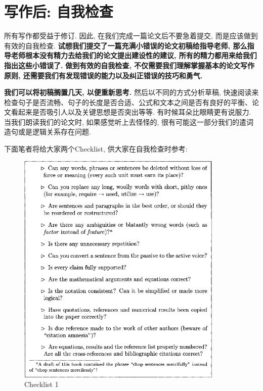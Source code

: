 \documentclass{formatBook}
\begin{document}
\section{写作后: 自我检查}
所有写作都受益于修订. 因此, 在我们完成一篇论文后不要急着提交, 而是应该做到有效的自我检查. \textbf{试想我们提交了一篇充满小错误的论文初稿给指导老师, 那么指导老师根本没有精力去给我们的论文提出建设性的建议, 所有的精力都用来给我们指出这些小错误了.} \textbf{做到有效的自我检查, 不仅需要我们理解掌握基本的论文写作原则, 还需要我们有发现错误的能力以及纠正错误的技巧和勇气. }\par
\textbf{我们可以将初稿搁置几天, 以便重新思考. }然后以不同的方式分析草稿, 快速阅读来检查句子是否流畅、句子的长度是否合适、公式和文本之间是否有良好的平衡、论文看起来是否吸引人以及关键思想是否突出等等. 有时候耳朵比眼睛更有说服力. 当我们朗读我们的论文时, 如果感觉听上去怪怪的, 很有可能这一部分我们的遣词造句或是逻辑关系存在问题. \par
下面笔者将给大家两个Checklist\cite{TanChecklist}, 供大家在自我检查时参考: 
\begin{figure}[htb]
    \centering
    \includegraphics[width=0.875\textwidth]{figure/Figure 7.1.png}
    \caption{Checklist 1}
    \label{fig:my_label}
\end{figure}
\end{document}
